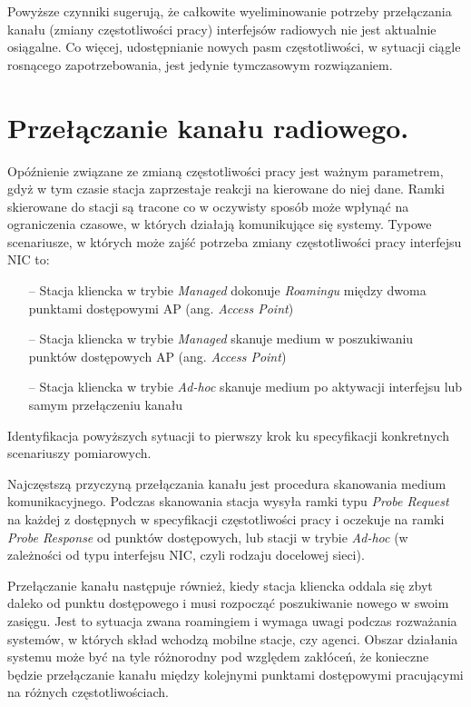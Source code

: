 Powyższe czynniki sugerują, że całkowite wyeliminowanie potrzeby przełączania kanału (zmiany częstotliwości pracy) interfejsów radiowych nie jest aktualnie osiągalne. Co więcej, udostępnianie nowych pasm częstotliwości, w sytuacji ciągle rosnącego zapotrzebowania, jest jedynie tymczasowym rozwiązaniem.  


\section{Przełączanie kanału radiowego.}
Opóźnienie związane ze zmianą częstotliwości pracy jest ważnym parametrem, gdyż w tym czasie stacja zaprzestaje reakcji na kierowane do niej dane. Ramki skierowane do stacji są tracone co w oczywisty sposób może wpłynąć na ograniczenia czasowe, w których działają komunikujące się systemy. 
Typowe scenariusze, w których może zajść potrzeba zmiany częstotliwości pracy interfejsu NIC to:
\begin{itemize}
\item[--] Stacja kliencka w trybie \emph{Managed} dokonuje \emph{Roamingu} między dwoma punktami dostępowymi AP (ang. \emph{Access Point}) 
\item[--] Stacja kliencka w trybie \emph{Managed} skanuje medium w poszukiwaniu punktów dostępowych AP (ang. \emph{Access Point})
\item[--] Stacja kliencka w trybie \emph{Ad-hoc} skanuje medium po aktywacji interfejsu lub samym przełączeniu kanału 
\end{itemize}
Identyfikacja powyższych sytuacji to pierwszy krok ku specyfikacji konkretnych scenariuszy pomiarowych. 

Najczęstszą przyczyną przełączania kanału jest procedura skanowania medium komunikacyjnego. Podczas skanowania stacja wysyła ramki typu \emph{Probe Request} na każdej z dostępnych w specyfikacji \cite{std:IEEE80211} częstotliwości pracy i oczekuje na ramki \emph{Probe Response} od punktów dostępowych, lub stacji w trybie \emph{Ad-hoc} (w zależności od typu interfejsu NIC, czyli rodzaju docelowej sieci).

Przełączanie kanału następuje również, kiedy stacja kliencka oddala się zbyt daleko od punktu dostępowego i musi rozpocząć poszukiwanie nowego w swoim zasięgu. Jest to sytuacja zwana roamingiem i wymaga uwagi podczas rozważania systemów, w których skład wchodzą mobilne stacje, czy agenci. Obszar działania systemu może być na tyle różnorodny pod względem zakłóceń, że konieczne będzie przełączanie kanału między kolejnymi punktami dostępowymi pracującymi na różnych częstotliwościach.

